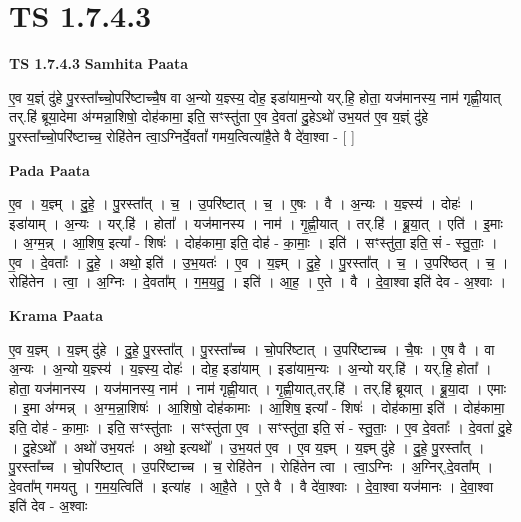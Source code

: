 \documentclass[17pt]{extarticle}
\begin{document}
\section*{ TS 1.7.4.3 }

\textbf{TS 1.7.4.3 } \newline
\textbf{Samhita Paata} \newline

ए॒व य॒ज्ञ्ं दु॑हे पु॒रस्ता᳚च्चो॒परि॑ष्टाच्चै॒ष वा अ॒न्यो य॒ज्ञ्स्य॒ दोह॒ इडा॑याम॒न्यो यर्.हि॒ होता॒ यज॑मानस्य॒ नाम॑ गृह्णी॒यात् तर्.हि॑ ब्रूया॒देमा अ॑ग्मन्ना॒शिषो॒ दोह॑कामा॒ इति॒ सꣳस्तु॑ता ए॒व दे॒वता॑ दु॒हेऽथो॑ उभ॒यत॑ ए॒व य॒ज्ञ्ं दु॑हे पु॒रस्ता᳚च्चो॒परि॑ष्टाच्च॒ रोहि॑तेन त्वा॒ऽग्निर्दे॒वतां᳚ गमय॒त्वित्या॑है॒ते वै दे॑वा॒श्वा - [ ] \newline

\textbf{Pada Paata} \newline

ए॒व । य॒ज्ञ्म् । दु॒हे॒ । पु॒रस्ता᳚त् । च॒ । उ॒परि॑ष्टात् । च॒ । ए॒षः । वै । अ॒न्यः । य॒ज्ञ्स्य॑ । दोहः॑ । इडा॑याम् । अ॒न्यः । यर्.हि॑ । होता᳚ । यज॑मानस्य । नाम॑ । गृ॒ह्णी॒यात् । तर्.हि॑ । ब्रू॒या॒त् । एति॑ । इ॒माः । अ॒ग्म॒न्न् । आ॒शिष॒ इत्या᳚ - शिषः॑ । दोह॑कामा॒ इति॒ दोह॑ - का॒माः॒ । इति॑ । सꣳस्तु॑ता॒ इति॒ सं - स्तु॒ताः॒ । ए॒व । दे॒वताः᳚ । दु॒हे॒ । अथो॒ इति॑ । उ॒भ॒यतः॑ । ए॒व । य॒ज्ञ्म् । दु॒हे॒ । पु॒रस्ता᳚त् । च॒ । उ॒परि॑ष्ठत् । च॒ । रोहि॑तेन । त्वा॒ । अ॒ग्निः । दे॒वता᳚म् । ग॒म॒य॒तु॒ । इति॑ । आ॒ह॒ । ए॒ते । वै । दे॒वा॒श्वा इति॑ देव - अ॒श्वाः ।  \newline


\textbf{Krama Paata} \newline

ए॒व य॒ज्ञ्म् । य॒ज्ञ्म् दु॑हे । दु॒हे॒ पु॒रस्ता᳚त् । पु॒रस्ता᳚च्च । चो॒परि॑ष्टात् । उ॒परि॑ष्टाच्च । चै॒षः । ए॒ष वै । वा अ॒न्यः । अ॒न्यो य॒ज्ञ्स्य॑ । य॒ज्ञ्स्य॒ दोहः॑ । दोह॒ इडा॑याम् । इडा॑याम॒न्यः । अ॒न्यो यर्.हि॑ । यर्.हि॒ होता᳚ । होता॒ यज॑मानस्य । यज॑मानस्य॒ नाम॑ । नाम॑ गृह्णी॒यात् । गृ॒ह्णी॒यात्,तर्.हि॑ । तर्.हि॑ ब्रूयात् । ब्रू॒या॒दा । एमाः । इ॒मा अ॑ग्मन्न् । अ॒ग्म॒न्ना॒शिषः॑ । आ॒शिषो॒ दोह॑कामाः । आ॒शिष॒ इत्या᳚ - शिषः॑ । दोह॑कामा॒ इति॑ । दोह॑कामा॒ इति॒ दोह॑ - का॒माः॒ । इति॒ सꣳस्तु॑ताः । सꣳस्तु॑ता ए॒व । सꣳस्तु॑ता॒ इति॒ सं - स्तु॒ताः॒ । ए॒व दे॒वताः᳚ । दे॒वता॑ दु॒हे । दु॒हेऽथो᳚ । अथो॑ उभ॒यतः॑ । अथो॒ इत्यथो᳚ । उ॒भ॒यत॑ ए॒व । ए॒व य॒ज्ञ्म् । य॒ज्ञ्म् दु॑हे । दु॒हे॒ पु॒रस्ता᳚त् । पु॒रस्ता᳚च्च । चो॒परि॑ष्टात् । उ॒परि॑ष्टाच्च । च॒ रोहि॑तेन । रोहि॑तेन त्वा । त्वा॒ऽग्निः । अ॒ग्निर्,दे॒वता᳚म् । दे॒वता᳚म् गमयतु । ग॒म॒य॒त्विति॑ । इत्या॑ह । आ॒है॒ते । ए॒ते वै । वै दे॑वा॒श्वाः । दे॒वा॒श्वा यज॑मानः । दे॒वा॒श्वा इति॑ देव - अ॒श्वाः \newline
\end{document}
